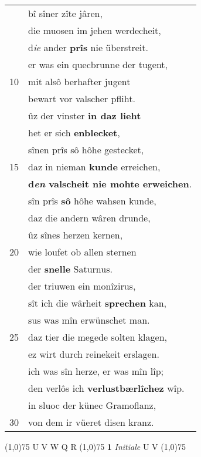 \documentclass[8pt,a4paper,notitlepage]{article}
\begin{document}
\begin{table}[ht]
\begin{minipage}[t]{0.5\linewidth}
\begin{tabular}{rl}
 & bî sîner zîte jâren,\\ 
 & die muosen im jehen werdecheit,\\ 
 & d\textit{ie} ander \textbf{prîs} nie überstreit.\\ 
 & er was ein quecbrunne der tugent,\\ 
10 & mit alsô berhafter jugent\\ 
 & bewart vor valscher pfliht.\\ 
 & ûz der vinster \textbf{in daz lieht}\\ 
 & het er sich \textbf{enblecket},\\ 
 & sînen prîs sô hôhe gestecket,\\ 
15 & daz in nieman \textbf{kunde} erreichen,\\ 
 & \textbf{d\textit{en} valscheit nie mohte erweichen}.\\ 
 & sîn prîs \textbf{sô} hôhe wahsen kunde,\\ 
 & daz die andern wâren drunde,\\ 
 & ûz sînes herzen kernen,\\ 
20 & wie loufet ob allen sternen\\ 
 & der \textbf{snelle} Saturnus.\\ 
 & der triuwen ein monîzirus,\\ 
 & sît ich die wârheit \textbf{sprechen} kan,\\ 
 & sus was mîn erwünschet man.\\ 
25 & daz tier die megede solten klagen,\\ 
 & ez wirt durch reinekeit erslagen.\\ 
 & ich was sîn herze, er was mîn lîp;\\ 
 & den verlôs ich \textbf{verlustbærlîchez} wîp.\\ 
 & in sluoc der künec Gramoflanz,\\ 
30 & von dem ir vüeret disen kranz.\\ 
\end{tabular}
\scriptsize
\line(1,0){75} \newline
U V W Q R \newline
\line(1,0){75} \newline
\textbf{1} \textit{Initiale} U V  \newline
\line(1,0){75} \newline

\end{minipage}
\end{table}
\end{document}

